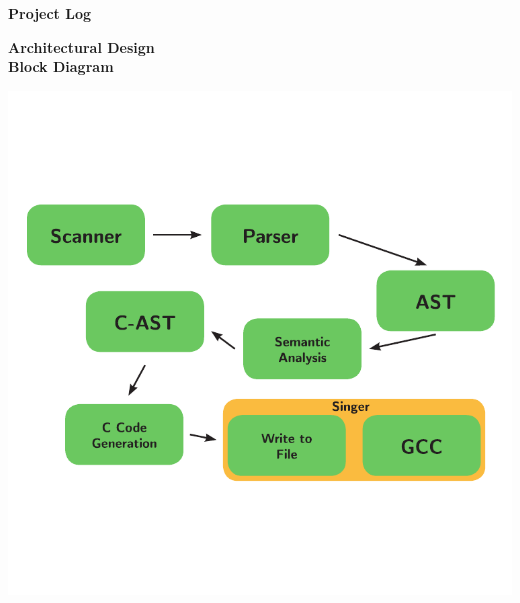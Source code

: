 \documentclass[11pt, oneside]{article}   	%
\begin{document}
\newpage
\Large\textbf{Project Log}\\[1em]
\normalsize


\newpage
\LARGE\textbf{Architectural Design}\\[2em]
\normalsize
\Large\textbf{Block Diagram}\\[1em]
\normalsize
\centerline{\includegraphics[scale=1.2]{block.pdf}}
\end{document}
